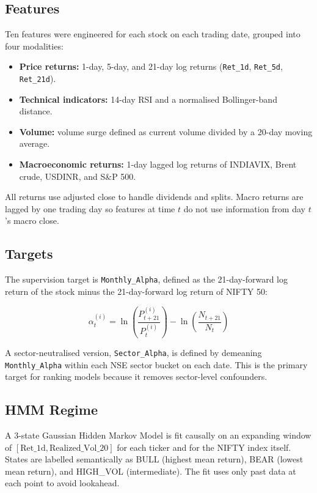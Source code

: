 \documentclass[conference]{IEEEtran}
\begin{document}
\subsection{Features}

Ten features were engineered for each stock on each trading date, grouped into four modalities:

\begin{itemize}
    \item \textbf{Price returns:} 1-day, 5-day, and 21-day log returns (\texttt{Ret\_1d}, \texttt{Ret\_5d}, \texttt{Ret\_21d}).
    \item \textbf{Technical indicators:} 14-day RSI and a normalised Bollinger-band distance.
    \item \textbf{Volume:} volume surge defined as current volume divided by a 20-day moving average.
    \item \textbf{Macroeconomic returns:} 1-day lagged log returns of INDIAVIX, Brent crude, USDINR, and S\&P 500.
\end{itemize}

All returns use adjusted close to handle dividends and splits. Macro returns are lagged by one trading day so features at time $t$ do not use information from day $t$'s macro close.

\subsection{Targets}

The supervision target is \texttt{Monthly\_Alpha}, defined as the 21-day-forward log return of the stock minus the 21-day-forward log return of NIFTY 50:

\[
\alpha_t^{(i)} = \ln\left(\frac{P_{t+21}^{(i)}}{P_t^{(i)}}\right) - \ln\left(\frac{N_{t+21}}{N_t}\right)
\]

A sector-neutralised version, \texttt{Sector\_Alpha}, is defined by demeaning \texttt{Monthly\_Alpha} within each NSE sector bucket on each date. This is the primary target for ranking models because it removes sector-level confounders.

\subsection{HMM Regime}

A 3-state Gaussian Hidden Markov Model is fit causally on an expanding window of $[\text{Ret\_1d}, \text{Realized\_Vol\_20}]$ for each ticker and for the NIFTY index itself. States are labelled semantically as BULL (highest mean return), BEAR (lowest mean return), and HIGH\_VOL (intermediate). The fit uses only past data at each point to avoid lookahead.
\end{document}
